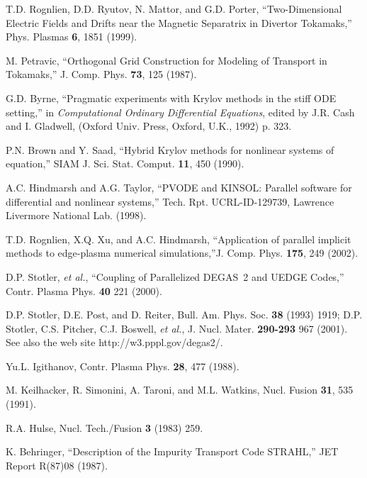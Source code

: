 \documentclass [12pt]{article}
\begin{document}
\begin{thebibliography}{99}
 T.D. Rognlien, D.D. Ryutov, N. Mattor, and G.D. Porter,
  ``Two-Dimensional Electric Fields and Drifts near the Magnetic Separatrix in
  Divertor Tokamaks,'' Phys. Plasmas {\bf 6}, 1851 (1999).
  
 M. Petravic, ``Orthogonal Grid Construction for Modeling
  of Transport in Tokamaks,'' J. Comp. Phys. {\bf 73}, 125 (1987).

 G.D. Byrne, ``Pragmatic experiments with Krylov methods in
  the stiff ODE setting,'' in {\it Computational Ordinary Differential
    Equations}, edited by J.R. Cash and I. Gladwell, (Oxford Univ. Press,
  Oxford, U.K., 1992) p. 323.
  
 P.N. Brown and Y. Saad, ``Hybrid Krylov methods for
  nonlinear systems of equation,'' SIAM J. Sci. Stat. Comput. {\bf 11}, 450
  (1990).

 A.C. Hindmarsh and A.G. Taylor, ``{\sf PVODE} and {\sf
    KINSOL}: Parallel software for differential and nonlinear systems,'' Tech.
  Rpt. UCRL-ID-129739, Lawrence Livermore National Lab. (1998).
  
 T.D. Rognlien, X.Q. Xu, and A.C. Hindmarsh, ``Application of
  parallel implicit methods to edge-plasma numerical simulations,''J. Comp. Phys.
{\bf 175}, 249 (2002).
  
 D.P. Stotler, {\it et al.}, ``Coupling of Parallelized
  DEGAS~2 and UEDGE Codes,'' Contr. Plasma Phys. {\bf 40} 221 (2000).
  
 D.P. Stotler, D.E. Post, and D. Reiter, Bull. Am. Phys.  Soc.
  {\bf 38} (1993) 1919; D.P. Stotler, C.S. Pitcher, C.J. Boswell, {\it et
    al.}, J.  Nucl. Mater. {\bf 290-293} 967 (2001). See also the web site
  http://w3.pppl.gov/degas2/.

 Yu.L. Igithanov, Contr. Plasma Phys. {\bf 28}, 477 (1988).
  
 M. Keilhacker, R. Simonini, A. Taroni, and M.L. Watkins,
  Nucl. Fusion {\bf 31}, 535 (1991).

 R.A. Hulse, Nucl. Tech./Fusion {\bf 3} (1983) 259.
  
 K. Behringer, ``Description of the Impurity Transport Code
  STRAHL,'' JET Report R(87)08 (1987).

\end{thebibliography} 
\end{document}
